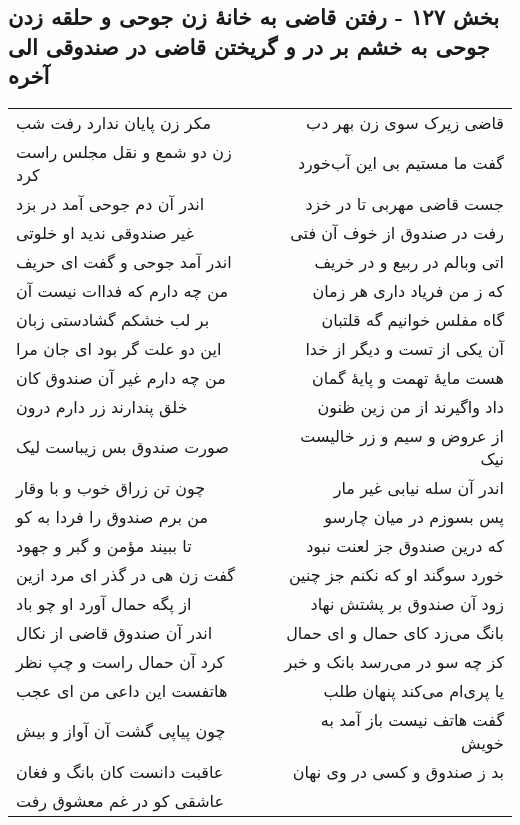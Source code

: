 \begin{center}
\section*{بخش ۱۲۷ - رفتن قاضی به خانهٔ زن جوحی و حلقه زدن جوحی به خشم بر در و گریختن قاضی در صندوقی الی آخره}
\label{sec:sh127}
\begin{longtable}{l p{0.5cm} r}
مکر زن پایان ندارد رفت شب
&&
قاضی زیرک سوی زن بهر دب
\\
زن دو شمع و نقل مجلس راست کرد
&&
گفت ما مستیم بی این آب‌خورد
\\
اندر آن دم جوحی آمد در بزد
&&
جست قاضی مهربی تا در خزد
\\
غیر صندوقی ندید او خلوتی
&&
رفت در صندوق از خوف آن فتی
\\
اندر آمد جوحی و گفت ای حریف
&&
اتی وبالم در ربیع و در خریف
\\
من چه دارم که فداات نیست آن
&&
که ز من فریاد داری هر زمان
\\
بر لب خشکم گشادستی زبان
&&
گاه مفلس خوانیم گه قلتبان
\\
این دو علت گر بود ای جان مرا
&&
آن یکی از تست و دیگر از خدا
\\
من چه دارم غیر آن صندوق کان
&&
هست مایهٔ تهمت و پایهٔ گمان
\\
خلق پندارند زر دارم درون
&&
داد واگیرند از من زین ظنون
\\
صورت صندوق بس زیباست لیک
&&
از عروض و سیم و زر خالیست نیک
\\
چون تن زراق خوب و با وقار
&&
اندر آن سله نیابی غیر مار
\\
من برم صندوق را فردا به کو
&&
پس بسوزم در میان چارسو
\\
تا ببیند مؤمن و گبر و جهود
&&
که درین صندوق جز لعنت نبود
\\
گفت زن هی در گذر ای مرد ازین
&&
خورد سوگند او که نکنم جز چنین
\\
از پگه حمال آورد او چو باد
&&
زود آن صندوق بر پشتش نهاد
\\
اندر آن صندوق قاضی از نکال
&&
بانگ می‌زد کای حمال و ای حمال
\\
کرد آن حمال راست و چپ نظر
&&
کز چه سو در می‌رسد بانک و خبر
\\
هاتفست این داعی من ای عجب
&&
یا پری‌ام می‌کند پنهان طلب
\\
چون پیاپی گشت آن آواز و بیش
&&
گفت هاتف نیست باز آمد به خویش
\\
عاقبت دانست کان بانگ و فغان
&&
بد ز صندوق و کسی در وی نهان
\\
عاشقی کو در غم معشوق رفت
&&

\end{longtable}
\end{center}
